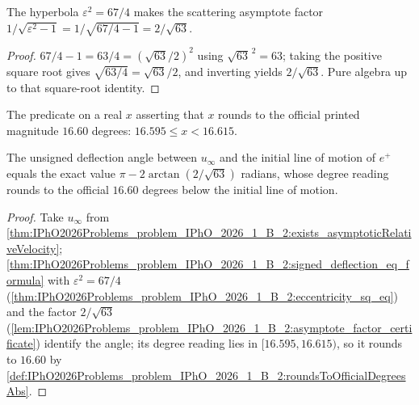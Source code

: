 \begin{lemma}
\label{lem:IPhO2026Problems_problem_IPhO_2026_1_B_2:asymptote_factor_certificate}
The hyperbola $\varepsilon^2 = 67/4$ makes the scattering asymptote factor
$1/\sqrt{\varepsilon^2 - 1} = 1/\sqrt{67/4 - 1} = 2/\sqrt{63}$.
\end{lemma}
\begin{proof}
$67/4 - 1 = 63/4 = (\sqrt{63}/2)^2$ using $\sqrt{63}^{\,2} = 63$; taking
the positive square root gives $\sqrt{63/4} = \sqrt{63}/2$, and inverting
yields $2/\sqrt{63}$.  Pure algebra up to that square-root identity.
\end{proof}

\begin{definition}
\label{def:IPhO2026Problems_problem_IPhO_2026_1_B_2:roundsToOfficialDegreesAbs}
The predicate on a real $x$ asserting that $x$ rounds to the official
printed magnitude $16.60$ degrees: $16.595 \le x < 16.615$.
\end{definition}

\begin{theorem}
\label{thm:IPhO2026Problems_problem_IPhO_2026_1_B_2:unsigned_deflection_angle_in_degrees_T1_B2}
The unsigned deflection angle between $u_\infty$ and the initial line of
motion of $e^+$ equals the exact value $\pi - 2\arctan(2/\sqrt{63})$
radians, whose degree reading rounds to the official $16.60$ degrees
below the initial line of motion.
\end{theorem}
\begin{proof}
Take $u_\infty$ from
\cref{thm:IPhO2026Problems_problem_IPhO_2026_1_B_2:exists_asymptoticRelativeVelocity};
\cref{thm:IPhO2026Problems_problem_IPhO_2026_1_B_2:signed_deflection_eq_formula}
with $\varepsilon^2 = 67/4$
(\cref{thm:IPhO2026Problems_problem_IPhO_2026_1_B_2:eccentricity_sq_eq})
and the factor $2/\sqrt{63}$
(\cref{lem:IPhO2026Problems_problem_IPhO_2026_1_B_2:asymptote_factor_certificate})
identify the angle; its degree reading lies in $[16.595, 16.615)$, so it
rounds to $16.60$ by
\cref{def:IPhO2026Problems_problem_IPhO_2026_1_B_2:roundsToOfficialDegreesAbs}.
\end{proof}
